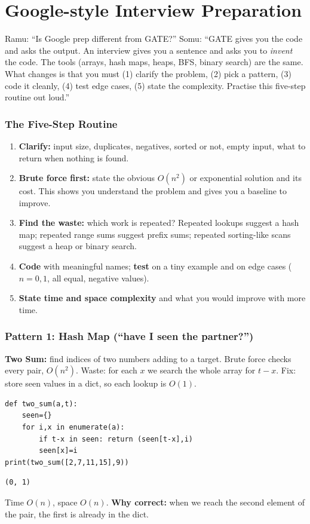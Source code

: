 \documentclass[11pt,a4paper]{article}
\begin{document}
\part{Google-style Interview Preparation}

\begin{story}
Ramu: ``Is Google prep different from GATE?'' Somu: ``GATE gives you the code and asks the output. An interview gives you a sentence and asks you to \emph{invent} the code. The tools (arrays, hash maps, heaps, BFS, binary search) are the same. What changes is that you must (1) clarify the problem, (2) pick a pattern, (3) code it cleanly, (4) test edge cases, (5) state the complexity. Practise this five-step routine out loud.''
\end{story}

\section{The Five-Step Routine}
\begin{enumerate}[leftmargin=*,itemsep=2pt]
\item \textbf{Clarify:} input size, duplicates, negatives, sorted or not, empty input, what to return when nothing is found.
\item \textbf{Brute force first:} state the obvious $O(n^2)$ or exponential solution and its cost. This shows you understand the problem and gives you a baseline to improve.
\item \textbf{Find the waste:} which work is repeated? Repeated lookups suggest a hash map; repeated range sums suggest prefix sums; repeated sorting-like scans suggest a heap or binary search.
\item \textbf{Code} with meaningful names; \textbf{test} on a tiny example and on edge cases ($n=0,1$, all equal, negative values).
\item \textbf{State time and space complexity} and what you would improve with more time.
\end{enumerate}

\section{Pattern 1: Hash Map (``have I seen the partner?'')}
\textbf{Two Sum:} find indices of two numbers adding to a target. Brute force checks every pair, $O(n^2)$. Waste: for each $x$ we search the whole array for $t-x$. Fix: store seen values in a dict, so each lookup is $O(1)$.
\begin{lstlisting}
def two_sum(a,t):
    seen={}
    for i,x in enumerate(a):
        if t-x in seen: return (seen[t-x],i)
        seen[x]=i
print(two_sum([2,7,11,15],9))
\end{lstlisting}
\begin{lstlisting}[style=out]
(0, 1)
\end{lstlisting}
Time $O(n)$, space $O(n)$. \textbf{Why correct:} when we reach the second element of the pair, the first is already in the dict.
\end{document}
